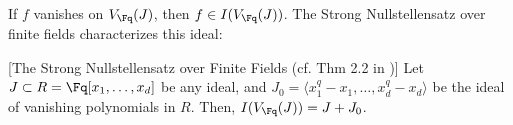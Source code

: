 If $f$ vanishes on $V_{\Fq}(J)$, then $f \in I(V_{\Fq}(J))$. The Strong
Nullstellensatz over finite fields characterizes this ideal:

\begin{Theorem}
\label{thm:sns}
  [The Strong Nullstellensatz over Finite Fields (cf. Thm 2.2 in
    \cite{gao:qe-gf-gb})]   
Let $J \subset R = \Fq[x_1,\dots,x_d]$ be any ideal, and $J_0=\langle
x_1^q-x_1,\dots,x_d^q-x_d\rangle$ be the ideal of vanishing 
polynomials in $R$. Then, $I(V_{\Fq}(J)) = J + J_0$.
\end{Theorem}
\vspace{-0.1in}
